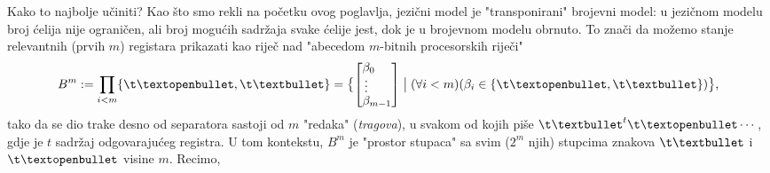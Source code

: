 Kako to najbolje učiniti? Kao što smo rekli na početku ovog poglavlja, jezični model je "transponirani" brojevni model: u jezičnom modelu broj ćelija nije ograničen, ali broj mogućih sadržaja svake ćelije jest, dok je u brojevnom modelu obrnuto. To znači da možemo stanje relevantnih (prvih $m$) registara prikazati kao riječ nad "abecedom $m$-bitnih procesorskih riječi"
\begin{equation}
\renewcommand{\arraystretch}{0.1}
    B^m:=\prod_{i<m}\{\t\textopenbullet,\t\textbullet\}=\bigl\{\left[\begin{array}{@{}l@{}}\beta_0\\[0mm]
        \vdotswithin{\beta}\\[1mm]
    \beta_{m-1}\end{array}\right]\bigm|(\forall i<m)(\beta_i\in\{\t\textopenbullet,\t\textbullet\})\bigr\}\text,
\end{equation}
tako da se dio trake desno od separatora sastoji od $m$ "redaka" (\emph{tragova}), u svakom od kojih piše $\t\textbullet^t\t\textopenbullet\dotsm$, gdje je $t$ sadržaj odgovarajućeg registra. U tom kontekstu, $B^m$ je "prostor stupaca" sa svim ($2^m$ njih) stupcima znakova $\t\textbullet$ i $\t\textopenbullet$ visine $m$. Recimo,
